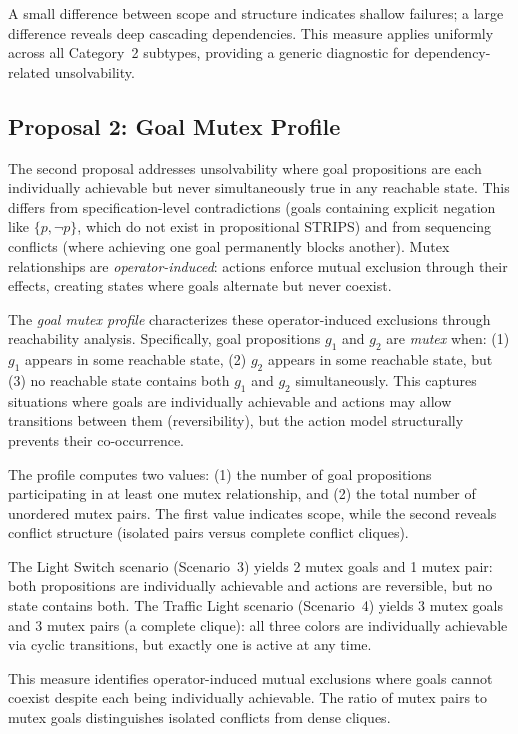 A small difference between scope and structure indicates shallow failures; a large difference reveals deep cascading dependencies. This measure applies uniformly across all Category~2 subtypes, providing a generic diagnostic for dependency-related unsolvability.

\subsection{Proposal 2: Goal Mutex Profile}
\label{sec:goal_mutex_profile}

The second proposal addresses unsolvability where goal propositions are each individually achievable but never simultaneously true in any reachable state. This differs from specification-level contradictions (goals containing explicit negation like $\{p, \neg p\}$, which do not exist in propositional STRIPS) and from sequencing conflicts (where achieving one goal permanently blocks another). Mutex relationships are \emph{operator-induced}: actions enforce mutual exclusion through their effects, creating states where goals alternate but never coexist.

The \emph{goal mutex profile} characterizes these operator-induced exclusions through reachability analysis. Specifically, goal propositions $g_1$ and $g_2$ are \emph{mutex} when: (1) $g_1$ appears in some reachable state, (2) $g_2$ appears in some reachable state, but (3) no reachable state contains both $g_1$ and $g_2$ simultaneously. This captures situations where goals are individually achievable and actions may allow transitions between them (reversibility), but the action model structurally prevents their co-occurrence.

The profile computes two values: (1) the number of goal propositions participating in at least one mutex relationship, and (2) the total number of unordered mutex pairs. The first value indicates scope, while the second reveals conflict structure (isolated pairs versus complete conflict cliques).

The Light Switch scenario (Scenario~3) yields 2 mutex goals and 1 mutex pair: both propositions are individually achievable and actions are reversible, but no state contains both. The Traffic Light scenario (Scenario~4) yields 3 mutex goals and 3 mutex pairs (a complete clique): all three colors are individually achievable via cyclic transitions, but exactly one is active at any time.

This measure identifies operator-induced mutual exclusions where goals cannot coexist despite each being individually achievable. The ratio of mutex pairs to mutex goals distinguishes isolated conflicts from dense cliques.

